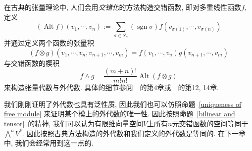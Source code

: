\begin{rem}
    在古典的张量理论中, 人们会用\textit{交错化}的方法构造交错函数, 即对多重线性函数$f$, 定义
    \[(\operatorname{Alt}f)(v_1,\cdots,v_n):=\sum_{\sigma\in S_n}(\operatorname{sgn}{\sigma})f(v_{\sigma(1)},\cdots,v_{\sigma(n)})\]
    并通过定义两个函数的张量积
    \[(f\otimes g)(v_1,\cdots,v_n,v_{n+1},\cdots,v_m)=f(v_1,\cdots,v_n)g(v_{n+1},\cdots,v_m)\]
    与交错函数的楔积
    \[f\wedge g=\frac{(m+n)!}{m!n!}\operatorname{Alt}(f\otimes g)\]
    来构造张量代数与外代数.
    具体的细节参阅~\parencite{Spivak_CalMani}~的第4章或~\parencite{Lee_IntroSmMani}~的第12, 14章.

    我们刚刚证明了外代数也具有泛性质, 因此我们也可以仿照命题~\ref{uniqueness of free module} 来证明某个模上的外代数的唯一性.
    因此按照命题~\ref{bilinear and tensor}~的精神,
    我们可以认为有限维向量空间$V$上所有$n$元交错函数的空间等同于$\displaystyle\bigwedge\nolimits^n V^*$.
    因此按照古典方法构造的外代数和我们定义的外代数是等同的.
    在下一章中, 我们会经常用到这一点的.
\end{rem}